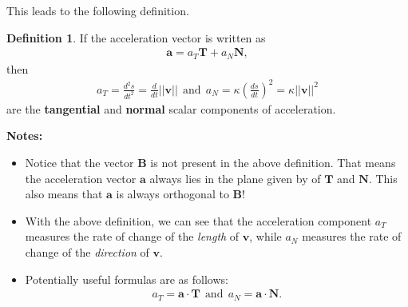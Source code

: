 \documentclass[12pt, letter]{article}
\theoremstyle{plain}
\numberwithin{theorem}{section}
\theoremstyle{definition}
\newtheorem{definition}[theorem]{Definition}
\begin{document}
\bigskip

This leads to the following definition.

\bigskip

\begin{definition}
If the acceleration vector is written as
\begin{align*}
\bm{a} = a_T \bm{T} + a_N \bm{N},
\end{align*}
then
\begin{align*}
a_T = \frac{d^2s}{dt^2} = \frac{d}{dt}||\bm{v}|| \ \ \text{and} \ \ a_N = \kappa \left(\frac{ds}{dt}\right)^2 = \kappa ||\bm{v}||^2
\end{align*}
are the \textbf{tangential} and \textbf{normal} scalar components of acceleration.
\end{definition}

\bigskip

\textbf{Notes:}
\begin{itemize}
\item Notice that the vector $\bm{B}$ is not present in the above definition. That means the acceleration vector $\bm{a}$ always lies in the plane given by of $\bm{T}$ and $\bm{N}$. This also means that $\bm{a}$ is always orthogonal to $\bm{B}$!
\item With the above definition, we can see that the acceleration component $a_T$ measures the rate of change of the \textit{length} of $\bm{v}$, while $a_N$ measures the rate of change of the \textit{direction} of $\bm{v}$.
\item Potentially useful formulas are as follows:
\begin{align*}
a_T = \bm{a} \cdot \bm{T} \ \ \text{and} \ \ a_N = \bm{a} \cdot \bm{N}.
\end{align*}
\end{itemize}

\bigskip

\hrulefill

\bigskip
\end{document}
